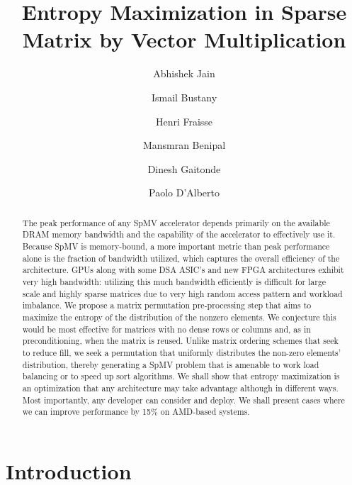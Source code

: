 \documentclass[manuscript,screen]{acmart}
\begin{document}
\title{Entropy Maximization in Sparse Matrix by Vector Multiplication }

\author{Abhishek Jain}
\author{Ismail Bustany}
\author{Henri Fraisse}
\author{Mansmran Benipal}
\author{Dinesh Gaitonde}
\author{Paolo D'Alberto}



\renewcommand{\shortauthors}{Jain et al.}

\begin{abstract}
The peak performance of any SpMV accelerator depends primarily on the
available DRAM memory bandwidth and the capability of the accelerator
to effectively use it.  Because SpMV is memory-bound, a more important
metric than peak performance alone is the fraction of bandwidth
utilized, which captures the overall efficiency of the
architecture. GPUs along with some DSA ASIC's and new FPGA
architectures exhibit very high bandwidth: utilizing this much
bandwidth efficiently is difficult for large scale and highly sparse
matrices due to very high random access pattern and workload
imbalance.  We propose a matrix permutation pre-processing step that
aims to maximize the entropy of the distribution of the nonzero
elements.  We conjecture this would be most effective for matrices
with no dense rows or columns and, as in preconditioning, when the
matrix is reused.  Unlike matrix ordering schemes that seek to reduce
fill, we seek a permutation that uniformly distributes the non-zero
elements' distribution, thereby generating a SpMV problem that is
amenable to work load balancing or to speed up sort algorithms.  We
shall show that entropy maximization is an optimization that any
architecture may take advantage although in different ways. Most
importantly, any developer can consider and deploy. We shall present
cases where we can improve performance by 15\% on AMD-based systems.

\end{abstract}

\maketitle

\section{Introduction} 
\label{sec:introduction}
\end{document}
